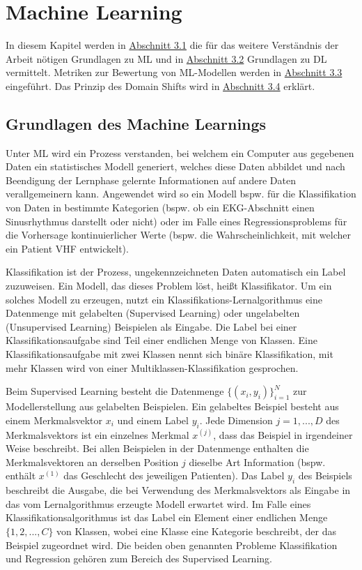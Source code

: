 \chapter{Machine Learning}\label{chap:MachineLearning}

In diesem Kapitel werden in \hyperref[sec:GrundlagenML]{Abschnitt 3.1} die für das weitere Verständnis der Arbeit nötigen Grundlagen zu \gls{ML} und in \hyperref[sec:DL]{Abschnitt 3.2} Grundlagen zu \gls{DL} vermittelt. Metriken zur Bewertung von \gls{ML}-Modellen werden in \hyperref[sec:metriken]{Abschnitt 3.3} eingeführt. Das Prinzip des Domain Shifts wird in \hyperref[sec:shift]{Abschnitt 3.4} erklärt.

\section{Grundlagen des Machine Learnings}\label{sec:GrundlagenML}

Unter \gls{ML} wird ein Prozess verstanden, bei welchem ein Computer aus gegebenen Daten ein statistisches Modell generiert, welches diese Daten abbildet und nach Beendigung der Lernphase gelernte Informationen auf andere Daten verallgemeinern kann. Angewendet wird so ein Modell bspw. für die Klassifikation von Daten in bestimmte Kategorien (bspw. ob ein \gls{EKG}-Abschnitt einen Sinusrhythmus darstellt oder nicht) oder im Falle eines Regressionsproblems für die Vorhersage kontinuierlicher Werte (bspw. die Wahrscheinlichkeit, mit welcher ein Patient \gls{VHF} entwickelt). \cite{nguyen_machine_2018} 

Klassifikation ist der Prozess, ungekennzeichneten Daten automatisch ein Label zuzuweisen. Ein Modell, das dieses Problem löst, heißt Klassifikator. Um ein solches Modell zu erzeugen, nutzt ein Klassifikations-Lernalgorithmus eine Datenmenge mit gelabelten (Supervised Learning) oder ungelabelten (Unsupervised Learning) Beispielen als Eingabe. Die Label bei einer Klassifikationsaufgabe sind Teil einer endlichen Menge von Klassen. Eine Klassifikationsaufgabe mit zwei Klassen nennt sich binäre Klassifikation, mit mehr Klassen wird von einer Multiklassen-Klassifikation gesprochen. \cite{burkov_machine_2019}

Beim Supervised Learning besteht die Datenmenge $\{(x_i, y_i)\}^{N}_{i=1}$ zur Modellerstellung aus gelabelten Beispielen. Ein gelabeltes Beispiel besteht aus einem Merkmalsvektor $x_i$ und einem Label $y_i$. Jede Dimension $j = 1,...,D$ des Merkmalsvektors ist ein einzelnes Merkmal $x^{(j)}$, dass das Beispiel in irgendeiner Weise beschreibt. Bei allen Beispielen in der Datenmenge enthalten die Merkmalsvektoren an derselben Position $j$ dieselbe Art Information (bspw. enthält $x^{(1)}$ das Geschlecht des jeweiligen Patienten). Das Label $y_i$ des Beispiels beschreibt die Ausgabe, die bei Verwendung des Merkmalsvektors als Eingabe in das vom Lernalgorithmus erzeugte Modell erwartet wird. Im Falle eines Klassifikationsalgorithmus ist das Label ein Element einer endlichen Menge $\{1,2,...,C\}$ von Klassen, wobei eine Klasse eine Kategorie beschreibt, der das Beispiel zugeordnet wird.
Die beiden oben genannten Probleme Klassifikation und Regression gehören zum Bereich des Supervised Learning. \cite{burkov_machine_2019} 

